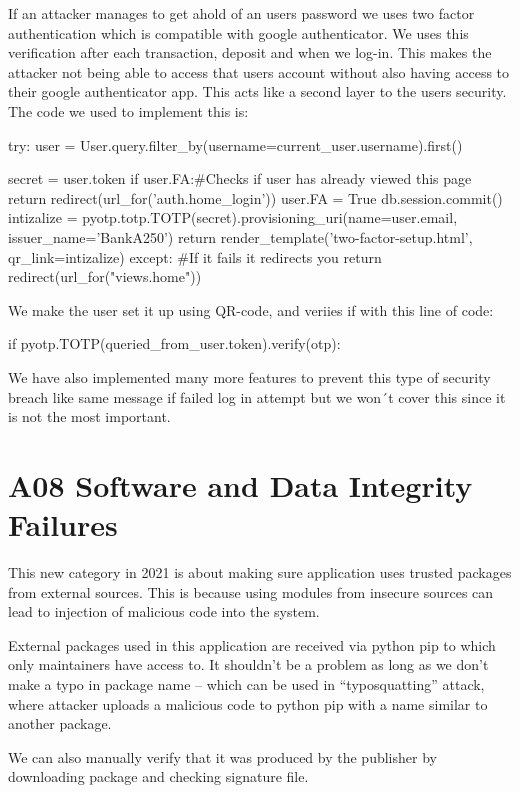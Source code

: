 If an attacker manages to get ahold of an users password we uses two factor authentication which is compatible with google authenticator. We uses this verification after each transaction, deposit and when we log-in. This makes the attacker not being able to access that users account without also having access to their google authenticator app. This acts like a second layer to the users security.  The code we used to implement this is:
\begin{python}
try: 
    user = User.query.filter_by(username=current_user.username).first()

    secret = user.token
    if user.FA:#Checks if user has already viewed this page
        return redirect(url_for('auth.home_login'))
    user.FA = True
    db.session.commit()
    intizalize = pyotp.totp.TOTP(secret).provisioning_uri(name=user.email, issuer_name='BankA250')
    return render_template('two-factor-setup.html', qr_link=intizalize)
except: #If it fails it redirects you
    return redirect(url_for("views.home"))
\end{python}
We make the user set it up using QR-code, and veriies if with this line of code:
\begin{python}
if pyotp.TOTP(queried_from_user.token).verify(otp):
\end{python}

We have also implemented many more features to prevent this type of security breach like same message if failed log in attempt but we won´t cover this since it is not the most important. 

\pagebreak
\section{A08 Software and Data Integrity Failures}

This new category in 2021 is about making sure application uses trusted packages from external sources. This is because using modules from insecure sources can lead to injection of malicious code into the system.

External packages used in this application are received via python pip to which only maintainers have access to. It shouldn’t be a problem as long as we don’t make a typo in package name – which can be used in “typosquatting” attack, where attacker uploads a malicious code to python pip with a name similar to another package.

We can also manually verify that it was produced by the publisher by downloading package and checking signature file.

